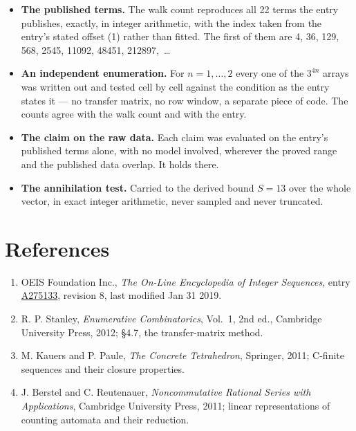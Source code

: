 \documentclass[11pt]{article}
\theoremstyle{definition}
\begin{document}
\begin{itemize}

\item {\bfseries The published terms.} The walk count reproduces all 22 terms the entry publishes, exactly, in integer arithmetic, with the index taken from the entry's stated offset (1) rather than fitted. The first of them are 4, 36, 129, 568, 2545, 11092, 48451, 212897,~\dots

\item {\bfseries An independent enumeration.} For $n = 1,\dots,2$ every one of the $3^{4n}$ arrays was written out and tested cell by cell against the condition as the entry states it --- no transfer matrix, no row window, a separate piece of code. The counts agree with the walk count and with the entry.

\item {\bfseries The claim on the raw data.} Each claim was evaluated on the entry's published terms alone, with no model involved, wherever the proved range and the published data overlap. It holds there.

\item {\bfseries The annihilation test.} Carried to the derived bound $S = 13$ over the whole vector, in exact integer arithmetic, never sampled and never truncated.

\end{itemize}

\section{References}

\begin{enumerate}

\item OEIS Foundation Inc., \emph{The On-Line Encyclopedia of Integer Sequences}, entry \href{https://oeis.org/A275133}{A275133}, revision 8, last modified Jan 31 2019.

\item R. P. Stanley, \emph{Enumerative Combinatorics}, Vol.~1, 2nd ed., Cambridge University Press, 2012; \S4.7, the transfer-matrix method.

\item M. Kauers and P. Paule, \emph{The Concrete Tetrahedron}, Springer, 2011; C-finite sequences and their closure properties.

\item J. Berstel and C. Reutenauer, \emph{Noncommutative Rational Series with Applications}, Cambridge University Press, 2011; linear representations of counting automata and their reduction.

\end{enumerate}
\end{document}
